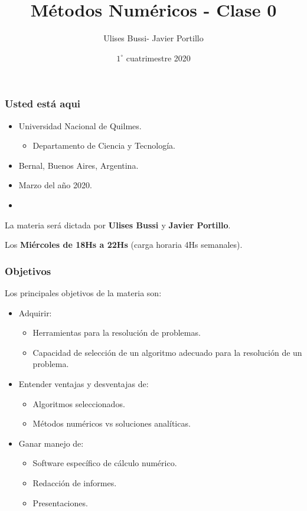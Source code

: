 \documentclass[xcolor=svgnames]{beamer} %
\title{Métodos Numéricos - Clase 0}
\author{Ulises Bussi- Javier Portillo}
\date{ $1^\circ$ cuatrimestre 2020}
\theoremstyle{plain}
\renewcommand{\textbf}[1]{{\bfseries\textcolor{redUnq2}{#1}}}
\theoremstyle{definition}
\begin{document}
 


\begin{frame} %
	\titlepage
\end{frame}


\begin{frame}
\frametitle{Usted está aqui} 

\begin{center}
\begin{itemize}
	\item Universidad Nacional de Quilmes.
	\begin{itemize}
		\item Departamento de Ciencia y Tecnología.
	\end{itemize}
	\item Bernal, Buenos Aires, Argentina.
	\item Marzo del año 2020.

	\item \begin{Large}
	\hspace{30pt}\textbf{Métodos Numéricos.}
	\end{Large}

	
\end{itemize}
\end{center}

\vspace{10pt}

La materia será dictada por \textbf{Ulises Bussi }y \textbf{Javier Portillo}.

Los \textbf{Miércoles de 18Hs a 22Hs} (carga horaria 4Hs semanales).

\end{frame}



\begin{frame}
\frametitle{Objetivos}
Los principales objetivos de la materia son:
\begin{itemize}
	\item Adquirir:
	\begin{itemize}
		\item Herramientas para la resolución de problemas.
		\item Capacidad de selección de un algoritmo adecuado para la resolución de un problema.
	\end{itemize}

	\item Entender ventajas y desventajas de:
	\begin{itemize}
		\item Algoritmos seleccionados.
		\item Métodos numéricos vs soluciones analíticas.
	\end{itemize}
	\item Ganar manejo de:
	\begin{itemize}
		\item Software específico de cálculo numérico.
		\item Redacción de informes.
		\item Presentaciones.
	\end{itemize}

  \end{itemize}
\end{frame}
\end{document}
